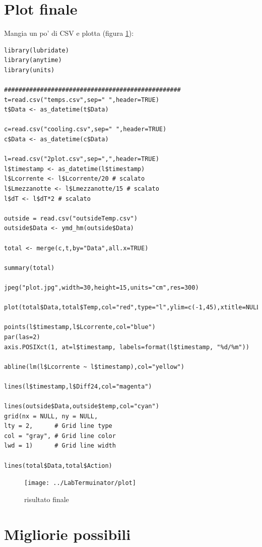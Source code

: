 \documentclass[a4paper,12pt]{article}
\begin{document}
\section{Plot finale}

Mangia un po' di CSV e plotta (figura \ref{fig:plot}):
\begin{lstlisting}
library(lubridate)
library(anytime)
library(units)

#################################################
t=read.csv("temps.csv",sep=" ",header=TRUE)
t$Data <- as_datetime(t$Data)

c=read.csv("cooling.csv",sep=" ",header=TRUE)
c$Data <- as_datetime(c$Data)

l=read.csv("2plot.csv",sep=",",header=TRUE)
l$timestamp <- as_datetime(l$timestamp)
l$Lcorrente <- l$Lcorrente/20 # scalato
l$Lmezzanotte <- l$Lmezzanotte/15 # scalato
l$dT <- l$dT*2 # scalato

outside = read.csv("outsideTemp.csv")
outside$Data <- ymd_hm(outside$Data)

total <- merge(c,t,by="Data",all.x=TRUE)

summary(total)

jpeg("plot.jpg",width=30,height=15,units="cm",res=300)

plot(total$Data,total$Temp,col="red",type="l",ylim=c(-1,45),xtitle=NULL)

points(l$timestamp,l$Lcorrente,col="blue")
par(las=2)
axis.POSIXct(1, at=l$timestamp, labels=format(l$timestamp, "%d/%m"))

abline(lm(l$Lcorrente ~ l$timestamp),col="yellow")

lines(l$timestamp,l$Diff24,col="magenta")

lines(outside$Data,outside$temp,col="cyan")
grid(nx = NULL, ny = NULL,
lty = 2,      # Grid line type
col = "gray", # Grid line color
lwd = 1)      # Grid line width

lines(total$Data,total$Action)
\end{lstlisting}


\begin{figure}
	\centering
	\texttt{[image: ../LabTermuinator/plot]}
	\caption{risultato finale}
	\label{fig:plot}
\end{figure}



\section{Migliorie possibili}
\end{document}
